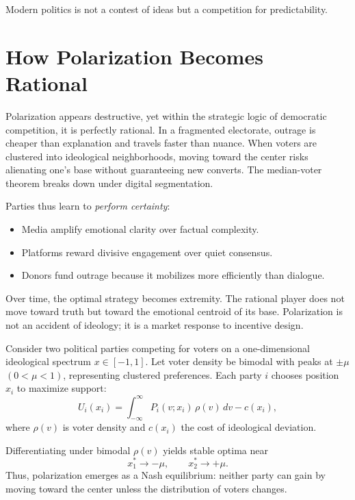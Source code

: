 \documentclass[12pt,twoside]{book}
\begin{document}
\begin{keyidea}
Modern politics is not a contest of ideas but a competition for predictability.
\end{keyidea}

\section{How Polarization Becomes Rational}

Polarization appears destructive, yet within the strategic logic of democratic competition, it is perfectly rational.  
In a fragmented electorate, outrage is cheaper than explanation and travels faster than nuance.  
When voters are clustered into ideological neighborhoods, moving toward the center risks alienating one’s base without guaranteeing new converts.  
The median-voter theorem breaks down under digital segmentation.  

Parties thus learn to \emph{perform certainty}:  
\begin{itemize}
  \item Media amplify emotional clarity over factual complexity.  
  \item Platforms reward divisive engagement over quiet consensus.  
  \item Donors fund outrage because it mobilizes more efficiently than dialogue.  
\end{itemize}

Over time, the optimal strategy becomes extremity.  
The rational player does not move toward truth but toward the emotional centroid of its base.  
Polarization is not an accident of ideology; it is a market response to incentive design.

\begin{tcolorbox}[colback=gray!5,colframe=gray!60,boxrule=0.4pt,arc=1mm,
title={Mathematical Interlude: Polarized Position Equilibrium}]
Consider two political parties competing for voters on a one-dimensional ideological spectrum $x\in[-1,1]$.  
Let voter density be bimodal with peaks at $\pm\mu$ $(0<\mu<1)$, representing clustered preferences.  
Each party $i$ chooses position $x_i$ to maximize support:
\[
U_i(x_i) = \int_{-\infty}^{\infty} P_i(v;x_i)\,\rho(v)\,dv - c(x_i),
\]
where $\rho(v)$ is voter density and $c(x_i)$ the cost of ideological deviation.

Differentiating under bimodal $\rho(v)$ yields stable optima near
\[
x_1^* \to -\mu, \qquad x_2^* \to +\mu.
\]
Thus, polarization emerges as a Nash equilibrium: neither party can gain by moving toward the center unless the distribution of voters changes.
\end{tcolorbox}
\end{document}
